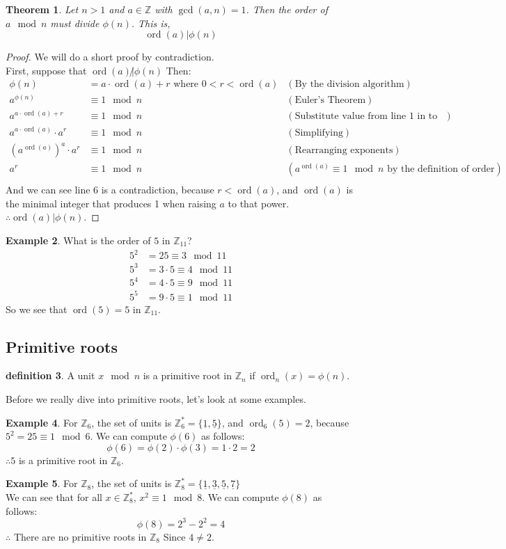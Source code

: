\documentclass[10pt]{article}
\newcommand{\Z}{\mathbb{Z}}
\newtheorem{theorem}{Theorem}
\theoremstyle{definition}
\newtheorem{definition}[theorem]{definition}
\newtheorem{ex}[theorem]{Example}
\theoremstyle{remark}
\def\Z{\mathbb{ Z}}
\def\ul{\underline}
\DeclareMathOperator{\ord}{ord}
\begin{document}
\begin{theorem}
Let $n>1$ and $a \in \Z$ with $\gcd(a,n)=1$.  Then the order of $a \mod n$ must divide $\phi(n)$.  This is, $$\ord(a)|\phi(n)$$
\end{theorem}
\begin{proof}
We will do a short proof by contradiction.\\
First, suppose that $\ord(a)\not | \phi(n)$ Then:
\begin{align}
\phi(n) &= a \cdot \ord(a) + r \text{ where } 0 < r < \ord(a) &(\text{By the division algorithm})\\
a^{\phi(n)} &\equiv 1 \mod n &(\text{Euler's Theorem})\\
a^{a \cdot \ord(a) + r} &\equiv 1 \mod n &(\text{Substitute value from line 1 in to line 2})\\
a^{a \cdot \ord(a)}\cdot a^r &\equiv 1 \mod n &(\text{Simplifying})\\
(a^{\ord(a)})^a \cdot a^r &\equiv 1 \mod n &(\text{Rearranging exponents})\\
a^r &\equiv 1 \mod n &(a^{\ord(a)}\equiv 1 \mod n \text{ by the definition of order})\\
\end{align}
And we can see line 6 is a contradiction, because $r < \ord(a)$, and $\ord(a)$ is the minimal integer that produces 1 when raising $a$ to that power.  $\therefore \ord(a)|\phi(n)$.
\end{proof}
\begin{ex}
What is the order of $5$ in $\Z_{11}$?
\setcounter{equation}{0}
\begin{align}
5^2 &= 25 \equiv 3 \mod 11\\
5^3 &= 3\cdot 5 \equiv 4 \mod 11\\
5^4 &= 4\cdot 5 \equiv 9 \mod 11\\
5^5 &= 9\cdot 5 \equiv 1 \mod 11
\end{align}
So we see that $\ord(5)=5$ in $\Z_{11}$.
\end{ex}
\subsection{Primitive roots}
\begin{definition}
A unit $x \mod n$ is a primitive root in $\Z_n$ if $\ord_n(x) = \phi(n)$.
\end{definition}
Before we really dive into primitive roots, let's look at some examples.
\begin{ex}
For $\Z_6$, the set of units is $\Z^{*}_6 = \{\ul{1},\ul{5}\}$, and $\ord_6(5)=2$, because $5^2=25\equiv 1 \mod 6$. We can compute $\phi(6)$ as follows: $$ \phi(6) = \phi(2) \cdot \phi(3) = 1 \cdot 2 = 2 $$
$\therefore 5$ is a primitive root in $\Z_6$.
\end{ex}
\begin{ex}
For $\Z_8$, the set of units is $\Z^{*}_8 = \{\ul{1},\ul{3},\ul{5},\ul{7}\}$\\
We can see that for all $x \in \Z^{*}_8$, $x^2 \equiv 1 \mod 8$. We can compute $\phi(8)$ as follows: $$ \phi(8) = 2^3 - 2^2 = 4$$
$\therefore$ There are no primitive roots in $\Z_8$ Since $ 4 \neq 2$.
\end{ex}
\pagebreak
\end{document}

